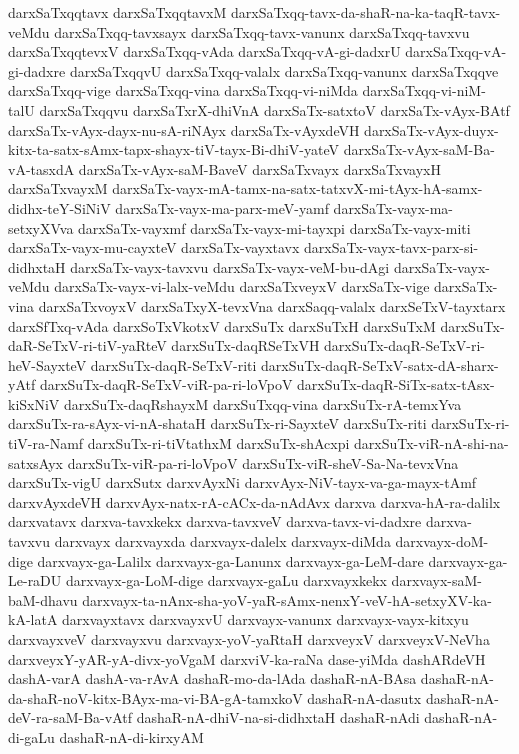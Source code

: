 {darxSaTxqqtavx
darxSaTxqqtavxM
darxSaTxqq-tavx-da-shaR-na-ka-taqR-tavx-veMdu
darxSaTxqq-tavxsayx
darxSaTxqq-tavx-vanunx
darxSaTxqq-tavxvu
darxSaTxqqtevxV
darxSaTxqq-vAda
darxSaTxqq-vA-gi-dadxrU
darxSaTxqq-vA-gi-dadxre
darxSaTxqqvU
darxSaTxqq-valalx
darxSaTxqq-vanunx
darxSaTxqqve
darxSaTxqq-vige
darxSaTxqq-vina
darxSaTxqq-vi-niMda
darxSaTxqq-vi-niM-talU
darxSaTxqqvu
darxSaTxrX-dhiVnA
darxSaTx-satxtoV
darxSaTx-vAyx-BAtf
darxSaTx-vAyx-dayx-nu-sA-riNAyx
darxSaTx-vAyxdeVH
darxSaTx-vAyx-duyx-kitx-ta-satx-sAmx-tapx-shayx-tiV-tayx-Bi-dhiV-yateV
darxSaTx-vAyx-saM-Ba-vA-tasxdA
darxSaTx-vAyx-saM-BaveV
darxSaTxvayx
darxSaTxvayxH
darxSaTxvayxM
darxSaTx-vayx-mA-tamx-na-satx-tatxvX-mi-tAyx-hA-samx-didhx-teY-SiNiV
darxSaTx-vayx-ma-parx-meV-yamf
darxSaTx-vayx-ma-setxyXVva
darxSaTx-vayxmf
darxSaTx-vayx-mi-tayxpi
darxSaTx-vayx-miti
darxSaTx-vayx-mu-cayxteV
darxSaTx-vayxtavx
darxSaTx-vayx-tavx-parx-si-didhxtaH
darxSaTx-vayx-tavxvu
darxSaTx-vayx-veM-bu-dAgi
darxSaTx-vayx-veMdu
darxSaTx-vayx-vi-lalx-veMdu
darxSaTxveyxV
darxSaTx-vige
darxSaTx-vina
darxSaTxvoyxV
darxSaTxyX-tevxVna
darxSaqq-valalx
darxSeTxV-tayxtarx
darxSfTxq-vAda
darxSoTxVkotxV
darxSuTx
darxSuTxH
darxSuTxM
darxSuTx-daR-SeTxV-ri-tiV-yaRteV
darxSuTx-daqRSeTxVH
darxSuTx-daqR-SeTxV-ri-heV-SayxteV
darxSuTx-daqR-SeTxV-riti
darxSuTx-daqR-SeTxV-satx-dA-sharx-yAtf
darxSuTx-daqR-SeTxV-viR-pa-ri-loVpoV
darxSuTx-daqR-SiTx-satx-tAsx-kiSxNiV
darxSuTx-daqRshayxM
darxSuTxqq-vina
darxSuTx-rA-temxYva
darxSuTx-ra-sAyx-vi-nA-shataH
darxSuTx-ri-SayxteV
darxSuTx-riti
darxSuTx-ri-tiV-ra-Namf
darxSuTx-ri-tiVtathxM
darxSuTx-shAcxpi
darxSuTx-viR-nA-shi-na-satxsAyx
darxSuTx-viR-pa-ri-loVpoV
darxSuTx-viR-sheV-Sa-Na-tevxVna
darxSuTx-vigU
darxSutx
darxvAyxNi
darxvAyx-NiV-tayx-va-ga-mayx-tAmf
darxvAyxdeVH
darxvAyx-natx-rA-cACx-da-nAdAvx
darxva
darxva-hA-ra-dalilx
darxvatavx
darxva-tavxkekx
darxva-tavxveV
darxva-tavx-vi-dadxre
darxva-tavxvu
darxvayx
darxvayxda
darxvayx-dalelx
darxvayx-diMda
darxvayx-doM-dige
darxvayx-ga-Lalilx
darxvayx-ga-Lanunx
darxvayx-ga-LeM-dare
darxvayx-ga-Le-raDU
darxvayx-ga-LoM-dige
darxvayx-gaLu
darxvayxkekx
darxvayx-saM-baM-dhavu
darxvayx-ta-nAnx-sha-yoV-yaR-sAmx-nenxY-veV-hA-setxyXV-ka-kA-latA
darxvayxtavx
darxvayxvU
darxvayx-vanunx
darxvayx-vayx-kitxyu
darxvayxveV
darxvayxvu
darxvayx-yoV-yaRtaH
darxveyxV
darxveyxV-NeVha
darxveyxY-yAR-yA-divx-yoVgaM
darxviV-ka-raNa
dase-yiMda
dashARdeVH
dashA-varA
dashA-va-rAvA
dashaR-mo-da-lAda
dashaR-nA-BAsa
dashaR-nA-da-shaR-noV-kitx-BAyx-ma-vi-BA-gA-tamxkoV
dashaR-nA-dasutx
dashaR-nA-deV-ra-saM-Ba-vAtf
dashaR-nA-dhiV-na-si-didhxtaH
dashaR-nAdi
dashaR-nA-di-gaLu
dashaR-nA-di-kirxyAM
}
